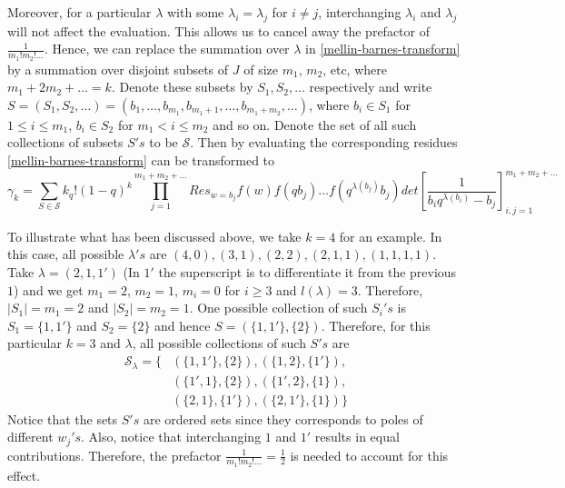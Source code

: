 Moreover, for a particular $\lambda$ with some $\lambda_i = \lambda_j$ for $i \neq j$, interchanging $\lambda_i$ and $\lambda_j$ will not affect the evaluation. This allows us to cancel away the prefactor of $\frac{1}{m_1! m_2! \dots}$. Hence, we can replace the summation over $\lambda$ in \eqref{mellin-barnes-transform} by a summation over disjoint subsets of $\mathit{J}$ of size $m_1$, $m_2$, etc, where $m_1 + 2m_2 + \dots = k$. Denote these subsets by $S_1, S_2, \dots$ respectively and write $S = (S_1, S_2, \dots ) = (b_1, \dots, b_{m_1}, b_{m_1+1}, \dots, b_{m_1 + m_2}, \dots)$, where $b_i \in S_1$ for $1 \le i \le m_1$, $b_i \in S_2$ for $m_1 < i \le m_2$ and so on. Denote the set of all such collections of subsets $S's$ to be $\mathcal{S}$. Then by evaluating the corresponding residues \eqref{mellin-barnes-transform} can be transformed to
\begin{equation}
\gamma_k = \sum_{S \in \mathcal{S}} k_q! (1-q)^k \prod_{j=1}^{m_1+m_2+\dots} Res_{w=b_j} f(w) f(qb_j) \dots f(q^{\lambda(b_j)} b_j) det\left[ \frac{1}{b_iq^{\lambda(b_i)} - b_j} \right]_{i,j=1}^{m_1+m_2+\dots}
\end{equation}

To illustrate what has been discussed above, we take $k = 4$ for an example. In this case, all possible $\lambda 's$ are $(4,0), (3,1), (2,2), (2,1,1), (1,1,1,1)$. Take $\lambda = (2,1,1')$ (In $1'$ the superscript is to differentiate it from the previous $1$) and we get $m_1 = 2$, $m_2 = 1$, $m_i = 0$ for $i \ge 3$ and $l(\lambda) = 3$. Therefore, $|S_1| = m_1 = 2$ and $|S_2| = m_2 = 1$. One possible collection of such $S_i's$ is $S_1 = \{1,1'\}$ and $S_2 = \{2\}$ and hence $S = (\{1,1'\},  \{2\})$. Therefore, for this particular $k = 3$ and $\lambda$, all possible collections of such $S's$ are 
\begin{align}
\mathcal{S}_{\lambda} = \{ &(\{1,1'\},\{2\}), (\{1,2\},\{1'\}), \\ 
													 &(\{1',1\},\{2\}), (\{1', 2\},\{1\}),\\
													 &(\{2,1\},\{1'\}), (\{2,1'\},\{1\})\}
\end{align}
Notice that the sets $S's$ are ordered sets since they corresponds to poles of different $w_j's$. Also, notice that interchanging $1$ and $1'$ results in equal contributions. Therefore, the prefactor $\frac{1}{m_1! m_2! \dots} = \frac{1}{2}$ is needed to account for this effect.


